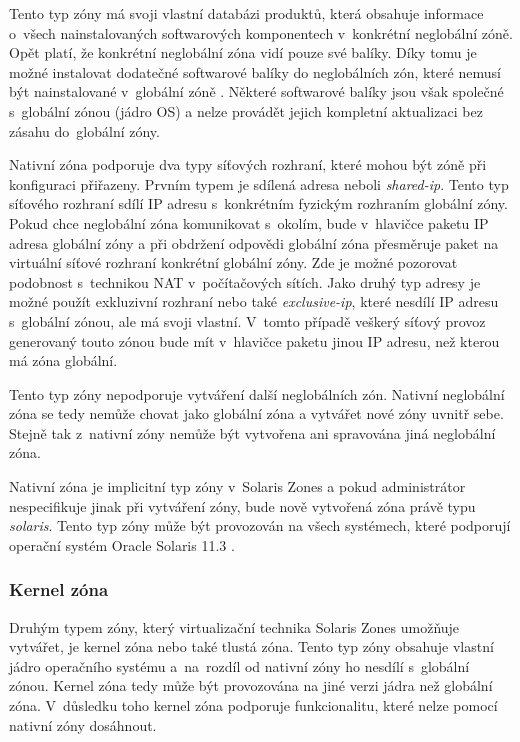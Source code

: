 Tento typ zóny má svoji vlastní databázi produktů, která obsahuje informace o~všech nainstalovaných softwarových
komponentech v~konkrétní neglobální zóně. Opět platí, že konkrétní neglobální zóna vidí pouze své balíky. Díky tomu je možné
instalovat dodatečné softwarové balíky do neglobálních zón, které nemusí být nainstalované v~globální zóně
\cite{oracle:solaris:zones:brands}. Některé softwarové balíky jsou však společné s~globální zónou (jádro OS) a nelze
provádět jejich kompletní aktualizaci bez zásahu do~globální zóny. 

Nativní zóna podporuje dva typy síťových rozhraní, které mohou být zóně při konfiguraci přiřazeny. Prvním typem je sdílená 
adresa neboli \textit{shared-ip}. Tento typ síťového rozhraní sdílí IP adresu s~konkrétním fyzickým rozhraním globální zóny. 
Pokud chce neglobální zóna komunikovat s~okolím, bude v~hlavičce paketu IP adresa globální zóny a při obdržení odpovědi
globální zóna přesměruje paket na virtuální síťové rozhraní konkrétní globální zóny. Zde je možné pozorovat podobnost
s~technikou NAT v~počítačových sítích. Jako druhý typ adresy je možné použít exkluzivní rozhraní nebo také \textit{exclusive-ip}, které
nesdílí IP adresu s~globální zónou, ale má svoji vlastní. V~tomto případě veškerý síťový provoz generovaný touto zónou bude
mít v~hlavičce paketu jinou IP adresu, než kterou má zóna globální.

Tento typ zóny nepodporuje vytváření další neglobálních zón. Nativní neglobální zóna se tedy nemůže chovat jako
globální zóna a vytvářet nové zóny uvnitř sebe. Stejně tak z~nativní zóny nemůže být vytvořena ani spravována jiná neglobální
zóna.

Nativní zóna je implicitní typ zóny v~Solaris Zones a pokud administrátor nespecifikuje jinak při vytváření zóny, bude nově
vytvořená zóna právě typu \textit{solaris}. Tento typ zóny může být provozován na všech systémech, které podporují operační
systém Oracle Solaris 11.3 \cite{oracle:solaris:zones:brands}.
\subsubsection{Kernel zóna}
\label{chapter:zones:types:kernel}
Druhým typem zóny, který virtualizační technika Solaris Zones umožňuje vytvářet, je kernel zóna nebo také tlustá zóna. Tento
typ zóny obsahuje vlastní jádro operačního systému a~na~rozdíl od nativní zóny ho nesdílí s~globální zónou. Kernel zóna
tedy může být provozována na jiné verzi jádra než globální zóna. V~důsledku toho kernel zóna podporuje funkcionalitu,
které nelze pomocí nativní zóny dosáhnout.

